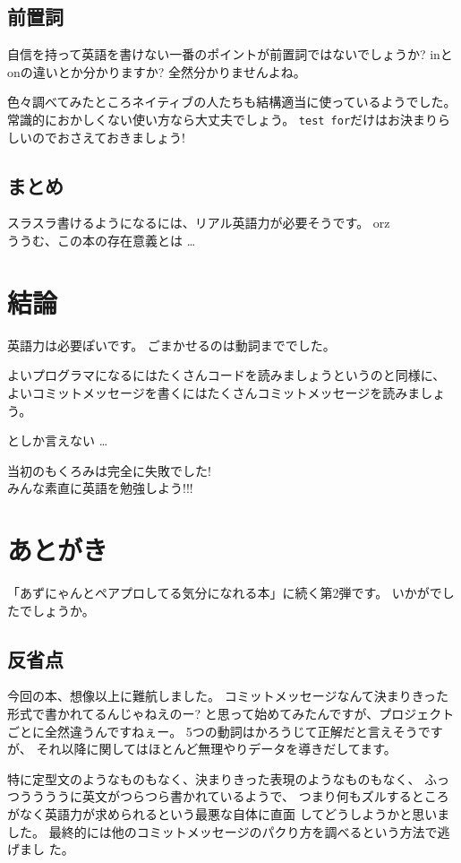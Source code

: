 \documentclass{jarticle}
\begin{document}
  \subsection{前置詞}
  自信を持って英語を書けない一番のポイントが前置詞ではないでしょうか?
  inとonの違いとか分かりますか? 全然分かりませんよね。

  色々調べてみたところネイティブの人たちも結構適当に使っているようでした。
  常識的におかしくない使い方なら大丈夫でしょう。
  {\tt test for}だけはお決まりらしいのでおさえておきましょう!

  \subsection{まとめ}
  スラスラ書けるようになるには、リアル英語力が必要そうです。 orz\\
  ううむ、この本の存在意義とは \dots

 \section{結論}
  英語力は必要ぽいです。
  ごまかせるのは動詞まででした。

  よいプログラマになるにはたくさんコードを読みましょうというのと同様に、
  よいコミットメッセージを書くにはたくさんコミットメッセージを読みましょ
  う。

  としか言えない \dots

  \begin{center}
  \Large
   当初のもくろみは完全に失敗でした!\\
   みんな素直に英語を勉強しよう!!!
  \end{center}


  \newpage
   \section*{あとがき}
  「あずにゃんとペアプロしてる気分になれる本」に続く第2弾です。
  いかがでしたでしょうか。

  \subsection*{反省点}
  今回の本、想像以上に難航しました。
  コミットメッセージなんて決まりきった形式で書かれてるんじゃねえのー?
  と思って始めてみたんですが、プロジェクトごとに全然違うんですねぇー。
  5つの動詞はかろうじて正解だと言えそうですが、
  それ以降に関してはほとんど無理やりデータを導きだしてます。

  特に定型文のようなものもなく、決まりきった表現のようなものもなく、
  ふっつううううに英文がつらつら書かれているようで、
  つまり何もズルするところがなく英語力が求められるという最悪な自体に直面
  してどうしようかと思いました。
  最終的には他のコミットメッセージのパクり方を調べるという方法で逃げまし
  た。
\end{document}
